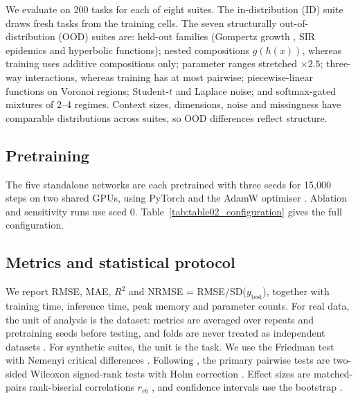 \documentclass[mathematics,article,submit,pdftex,moreauthors]{Definitions/mdpi}
\begin{document}
We evaluate on 200 tasks for each of eight suites. The in-distribution (ID) suite draws fresh tasks from the training cells. The seven structurally out-of-distribution (OOD) suites are: held-out families (Gompertz growth \cite{gompertz1825nature}, SIR epidemics \cite{kermack1927contribution} and hyperbolic functions); nested compositions $g(h(x))$, whereas training uses additive compositions only; parameter ranges stretched $\times2.5$; three-way interactions, whereas training has at most pairwise; piecewise-linear functions on Voronoi regions; Student-$t$ and Laplace noise; and softmax-gated mixtures of 2--4 regimes. Context sizes, dimensions, noise and missingness have comparable distributions across suites, so OOD differences reflect structure.

\subsection{Pretraining}

The five standalone networks are each pretrained with three seeds for 15,000 steps on two shared GPUs, using PyTorch \cite{paszke2019pytorch} and the AdamW optimiser \cite{loshchilov2019decoupled}. Ablation and sensitivity runs use seed 0. Table~\ref{tab:table02_configuration} gives the full configuration.



\subsection{Metrics and statistical protocol}

We report RMSE, MAE, $R^2$ and NRMSE = RMSE/SD($y_{\mathrm{test}}$), together with training time, inference time, peak memory and parameter counts. For real data, the unit of analysis is the dataset: metrics are averaged over repeats and pretraining seeds before testing, and folds are never treated as independent datasets \cite{dietterich1998approximate}. For synthetic suites, the unit is the task. We use the Friedman test with Nemenyi critical differences \cite{friedman1937use,demsar2006statistical}. Following \cite{benavoli2016should}, the primary pairwise tests are two-sided Wilcoxon signed-rank tests \cite{wilcoxon1945individual} with Holm correction \cite{holm1979simple,garcia2008extension}. Effect sizes are matched-pairs rank-biserial correlations $r_{rb}$ \cite{kerby2014simple}, and confidence intervals use the bootstrap \cite{efron1979bootstrap}.
\end{document}
